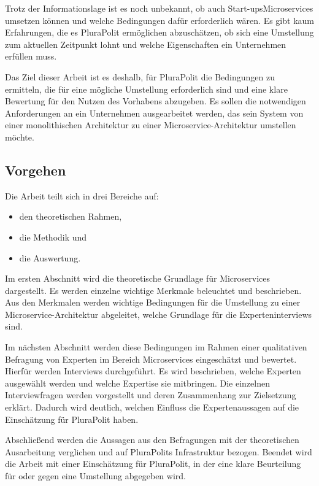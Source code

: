 Trotz der Informationslage ist es noch unbekannt, ob auch Start-ups\footnotemark Microservices umsetzen können und welche Bedingungen dafür erforderlich wären. Es gibt kaum Erfahrungen, die es PluraPolit ermöglichen abzuschätzen, ob sich eine Umstellung zum aktuellen Zeitpunkt lohnt und welche Eigenschaften ein Unternehmen erfüllen muss.


Das Ziel dieser Arbeit ist es deshalb, für PluraPolit die Bedingungen zu ermitteln, die für eine mögliche Umstellung erforderlich sind und eine klare Bewertung für den Nutzen des Vorhabens abzugeben. Es sollen die notwendigen Anforderungen an ein Unternehmen ausgearbeitet werden, das sein System von einer monolithischen Architektur zu einer Microservice-Architektur umstellen möchte.


\subsection{Vorgehen}

Die Arbeit teilt sich in drei Bereiche auf: 
\begin{itemize}
	\item den theoretischen Rahmen,
	\item die Methodik und
	\item die Auswertung.
\end{itemize}

Im ersten Abschnitt wird die theoretische Grundlage für Microservices dargestellt. Es werden einzelne wichtige Merkmale beleuchtet und beschrieben. Aus den Merkmalen werden wichtige Bedingungen für die Umstellung zu einer Microservice-Architektur abgeleitet, welche Grundlage für die Experteninterviews sind.

Im nächsten Abschnitt werden diese Bedingungen im Rahmen einer qualitativen Befragung von Experten im Bereich Microservices eingeschätzt und bewertet. Hierfür werden Interviews durchgeführt. Es wird beschrieben, welche Experten ausgewählt werden und welche Expertise sie mitbringen. Die einzelnen Interviewfragen werden vorgestellt und deren Zusammenhang zur Zielsetzung erklärt. Dadurch wird deutlich, welchen Einfluss die Expertenaussagen auf die Einschätzung für PluraPolit haben.

Abschließend werden die Aussagen aus den Befragungen mit der theoretischen Ausarbeitung verglichen und auf PluraPolits Infrastruktur bezogen. Beendet wird die Arbeit mit einer Einschätzung für PluraPolit, in der eine klare Beurteilung für oder gegen eine Umstellung abgegeben wird.
